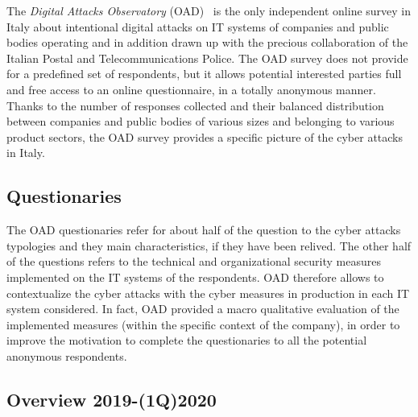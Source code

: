 \documentclass{easychair}
\begin{document}
The \textit{Digital Attacks Observatory} (OAD)~\cite{oadweb} is the only independent online survey in Italy about intentional digital attacks on IT systems of companies and public
bodies operating and in addition drawn up with the precious collaboration of the Italian Postal and Telecommunications Police. The OAD survey does not provide 
for a predefined set of respondents, but it allows potential interested parties full and free access to an online questionnaire, in a totally anonymous manner. 
Thanks to the number of responses collected and their balanced distribution between companies and public bodies of various sizes and belonging to various product 
sectors, the OAD survey provides a specific picture of the cyber attacks in Italy.


\subsection{Questionaries}

The OAD questionaries refer for about half of the question to the cyber attacks typologies and they main characteristics, if they have been relived. 
The other half of the questions refers to the technical and organizational security measures implemented on the IT systems of the respondents. 
OAD therefore allows to contextualize the cyber attacks with the cyber measures in production in each IT system considered. 
In fact, OAD provided a macro qualitative evaluation of the implemented measures (within the specific context of the company), in order to improve the motivation to 
complete the questionaries to all the potential anonymous respondents. 

\subsection{Overview 2019-(1Q)2020}
\end{document}
